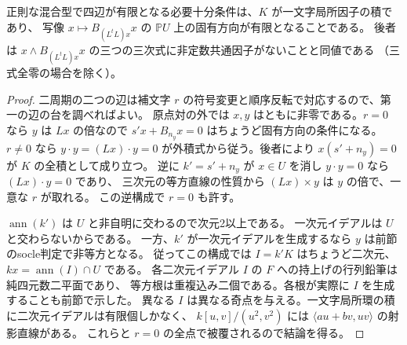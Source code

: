 \begin{proposition}\label{prop:mixed-finite-eigenvectors}
正則な混合型で四辺が有限となる必要十分条件は、$K$ が一文字局所因子の積であり、
写像 $x\mapsto B_{(L^tL)x}x$ の $\mathbb P U$ 上の固有方向が有限となることである。
後者は $x\wedge B_{(L^tL)x}x$ の三つの三次式に非定数共通因子がないことと同値である
（三式全零の場合を除く）。
\end{proposition}
\begin{proof}
二周期の二つの辺は補文字 $r$ の符号変更と順序反転で対応するので、第一の辺の台を調べればよい。
原点対の外では $x,y$ はともに非零である。$r=0$ なら $y$ は $Lx$ の倍なので
$s'x+B_{n_y}x=0$ はちょうど固有方向の条件になる。
$r\ne0$ なら $y\cdot y=(Lx)\cdot y=0$ が外積式から従う。後者により
$x(s'+n_y)=0$ が $K$ の全積として成り立つ。
逆に $k'=s'+n_y$ が $x\in U$ を消し $y\cdot y=0$ なら $(Lx)\cdot y=0$ であり、
三次元の等方直線の性質から $(Lx)\times y$ は $y$ の倍で、一意な $r$ が取れる。
この逆構成で $r=0$ も許す。

$\operatorname{ann}(k')$ は $U$ と非自明に交わるので次元2以上である。
一次元イデアルは $U$ と交わらないからである。
一方、$k'$ が一次元イデアルを生成するなら $y$ は前節のsocle判定で非等方となる。
従ってこの構成では $I=k'K$ はちょうど二次元、$kx=\operatorname{ann}(I)\cap U$ である。
各二次元イデアル $I$ の $F$ への持上げの行列鉛筆は純四元数二平面であり、
等方根は重複込み二個である。各根が実際に $I$ を生成することも前節で示した。
異なる $I$ は異なる奇点を与える。一文字局所環の積に二次元イデアルは有限個しかなく、
$k[u,v]/(u^2,v^2)$ には $\langle a u+b v,uv\rangle$ の射影直線がある。
これらと $r=0$ の全点で被覆されるので結論を得る。
\end{proof}

